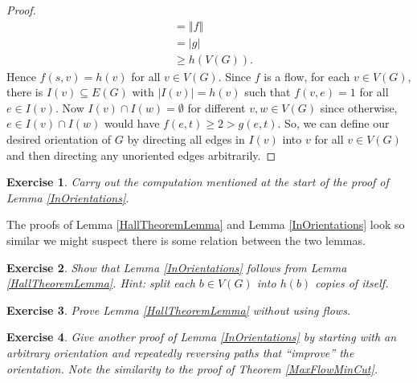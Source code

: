 \documentclass[openany]{tufte-book} %
\theoremstyle{plain}
\newtheorem{exercise}{Exercise}
\newcommand{\card}[1]{\left|#1\right|}
\newcommand{\size}[1]{\left\Vert#1\right\Vert}
\begin{document}
\begin{proof}
\begin{align*}
&=\size{f}\\
&= \card{g}\\
&\ge h(V(G)).
\end{align*}
Hence $f(s,v) = h(v)$ for all $v \in V(G)$.  Since $f$ is a flow, for each $v \in V(G)$, there is $I(v) \subseteq E(G)$ with $\card{I(v)} = h(v)$ such that $f(v, e) = 1$ for all $e \in I(v)$.
Now $I(v) \cap I(w) = \emptyset$ for different $v,w \in V(G)$ since otherwise, $e \in I(v) \cap I(w)$ would have $f(e, t) \ge 2 > g(e, t)$.  So, we can define our desired orientation of $G$
by directing all edges in $I(v)$ into $v$ for all $v \in V(G)$ and then directing any unoriented edges arbitrarily. 
\end{proof}

\begin{exercise}
Carry out the computation mentioned at the start of the proof of Lemma \ref{InOrientations}. 
\end{exercise}

The proofs of Lemma \ref{HallTheoremLemma} and Lemma \ref{InOrientations} look so similar we might suspect there is some relation between the two lemmas.
\begin{exercise}
Show that Lemma \ref{InOrientations} follows from Lemma \ref{HallTheoremLemma}.  Hint: split each $b \in V(G)$ into $h(b)$ copies of itself.
\end{exercise}

\begin{exercise}
Prove Lemma \ref{HallTheoremLemma} without using flows.
\end{exercise}

\begin{exercise}
Give another proof of Lemma \ref{InOrientations} by starting with an arbitrary orientation and repeatedly reversing paths that ``improve'' the orientation.
Note the similarity to the proof of Theorem \ref{MaxFlowMinCut}.
\end{exercise}
\end{document}
